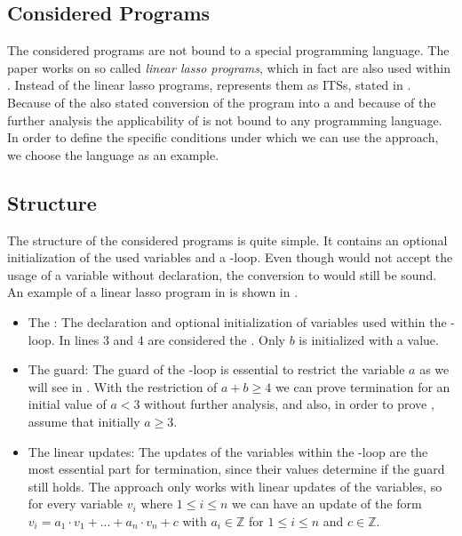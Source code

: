\subsection{Considered Programs}
The considered programs are not bound to a special programming language. The paper works on so called \textit{linear lasso programs}, which in fact are also used within \aprove. Instead of the linear lasso programs, \aprove represents them as ITSs, stated in . Because of the also stated conversion of the program into a \seg and because of the further analysis the applicability of \gnas is not bound to any programming language. \newline
In order to define the specific conditions under which we can use the approach, we choose the language  as an example.
\subsection{Structure}
\label{sec:structure}
The structure of the considered programs is quite simple. It contains an optional initialization  of the used variables and a -loop. Even though  would not accept the usage of a variable without declaration, the conversion to \llvm would still be sound. An example of a linear lasso program in  is shown in . 
\begin{itemize}
	\item The \stem: \newline
		The declaration and optional initialization of variables used within the -loop. In  lines 3 and 4 are considered the \stem. Only $b$ is initialized with a value.
	\item The guard: \newline
		The guard of the -loop is essential to restrict the variable $a$ as we will see in . With the restriction of $a+b\ge 4 $ we can prove termination for an initial value of $a < 3$ without further analysis, and also, in order to prove \nonterm, assume that initially $a \ge 3$.
	\item The linear updates: \newline
		The updates of the variables within the -loop are the most essential part for termination, since their values determine if the guard still holds. The approach only works with linear updates of the variables, so for every variable $v_i$ where $1\le i\le n$ we can have an update of the form $v_i=a_1\cdot v_1+...+a_n\cdot v_n+c$ with $a_i \in \mathbb{Z}$ for $1 \le i \le n$ and $c \in \mathbb{Z}$.
\end{itemize} 

